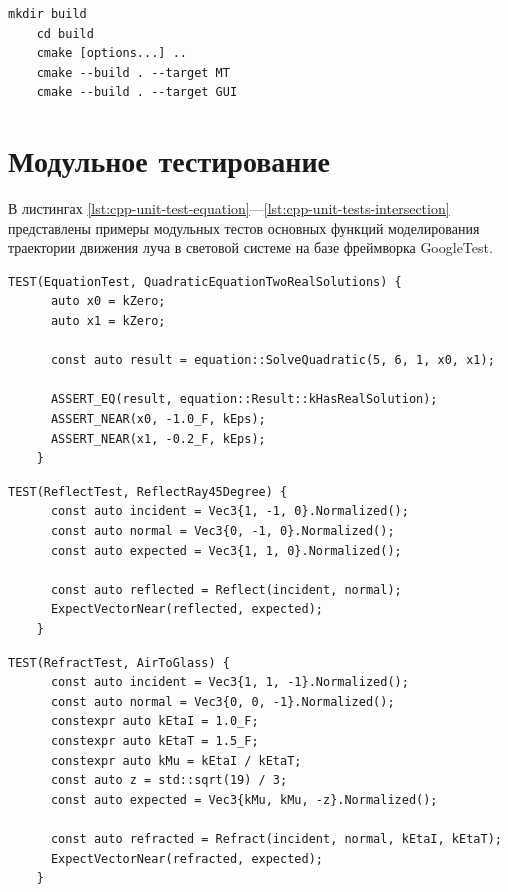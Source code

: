 \begin{lstlisting}[gobble=8, caption={Сборка\label{lst:cmake}}]
	mkdir build
	cd build
	cmake [options...] ..
	cmake --build . --target MT
	cmake --build . --target GUI
\end{lstlisting}

\section{Модульное тестирование}

В листингах \ref{lst:cpp-unit-test-equation}—\ref{lst:cpp-unit-tests-intersection} представлены примеры модульных тестов основных функций моделирования траектории движения луча в световой системе на базе фреймворка GoogleTest.

\begin{lstlisting}[gobble=8, caption={Юнит-тест функции решения квадратных уравнений\label{lst:cpp-unit-test-equation}}]
	TEST(EquationTest, QuadraticEquationTwoRealSolutions) {
	  auto x0 = kZero;
	  auto x1 = kZero;

	  const auto result = equation::SolveQuadratic(5, 6, 1, x0, x1);

	  ASSERT_EQ(result, equation::Result::kHasRealSolution);
	  ASSERT_NEAR(x0, -1.0_F, kEps);
	  ASSERT_NEAR(x1, -0.2_F, kEps);
	}
\end{lstlisting}

\begin{lstlisting}[gobble=8, caption={Юнит-тест функции отражения\label{lst:cpp-unit-test-reflection}}]
	TEST(ReflectTest, ReflectRay45Degree) {
	  const auto incident = Vec3{1, -1, 0}.Normalized();
	  const auto normal = Vec3{0, -1, 0}.Normalized();
	  const auto expected = Vec3{1, 1, 0}.Normalized();

	  const auto reflected = Reflect(incident, normal);
	  ExpectVectorNear(reflected, expected);
	}
\end{lstlisting}

\begin{lstlisting}[gobble=8, caption={Юнит-тест функции преломления\label{lst:cpp-unit-test-refraction}}]
	TEST(RefractTest, AirToGlass) {
	  const auto incident = Vec3{1, 1, -1}.Normalized();
	  const auto normal = Vec3{0, 0, -1}.Normalized();
	  constexpr auto kEtaI = 1.0_F;
	  constexpr auto kEtaT = 1.5_F;
	  constexpr auto kMu = kEtaI / kEtaT;
	  const auto z = std::sqrt(19) / 3;
	  const auto expected = Vec3{kMu, kMu, -z}.Normalized();

	  const auto refracted = Refract(incident, normal, kEtaI, kEtaT);
	  ExpectVectorNear(refracted, expected);
	}
\end{lstlisting}

